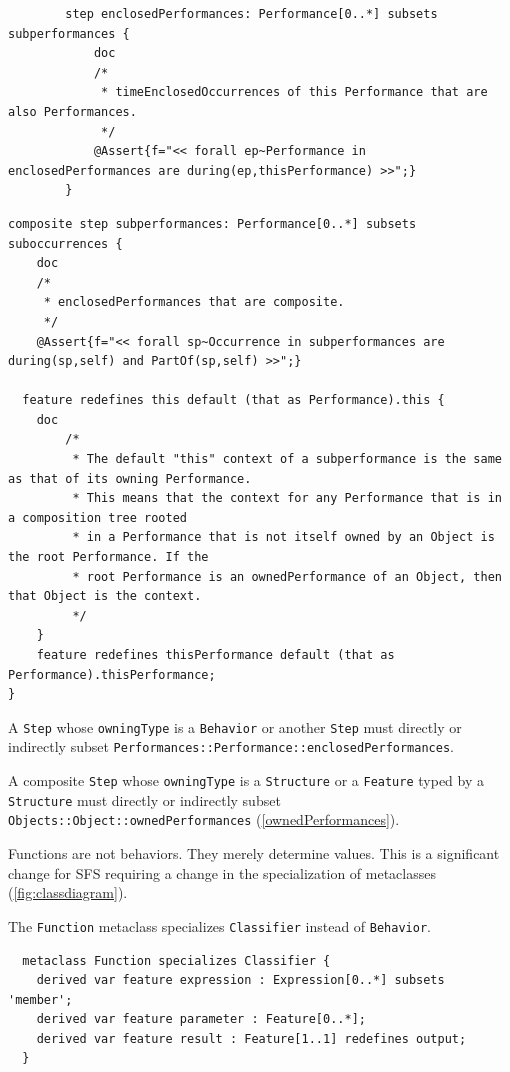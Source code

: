 \begin{lstlisting}
		step enclosedPerformances: Performance[0..*] subsets subperformances {
			doc
			/*
			 * timeEnclosedOccurrences of this Performance that are also Performances.
			 */
			@Assert{f="<< forall ep~Performance in enclosedPerformances are during(ep,thisPerformance) >>";}
		}
\end{lstlisting}

\begin{lstlisting}
composite step subperformances: Performance[0..*] subsets suboccurrences {
	doc
	/*
	 * enclosedPerformances that are composite.
	 */
	@Assert{f="<< forall sp~Occurrence in subperformances are during(sp,self) and PartOf(sp,self) >>";}

  feature redefines this default (that as Performance).this {
    doc
		/*
		 * The default "this" context of a subperformance is the same as that of its owning Performance.
		 * This means that the context for any Performance that is in a composition tree rooted
		 * in a Performance that is not itself owned by an Object is the root Performance. If the
		 * root Performance is an ownedPerformance of an Object, then that Object is the context.
		 */
	}
	feature redefines thisPerformance default (that as Performance).thisPerformance;
}
\end{lstlisting}

\pn A \texttt{Step} whose \texttt{owningType} is a \texttt{Behavior} or another \texttt{Step} must directly or indirectly subset
 \texttt{Performan\-ces::Performance::enclosedPerformances}.

\pn A composite \texttt{Step} whose \texttt{owningType} is a \texttt{Structure} or a \texttt{Feature} typed by a \texttt{Structure} must directly or
indirectly subset \texttt{Objects::Object::ownedPerformances} (\ref{ownedPerformances}).

\label{sec:functions}

\pn Functions are not behaviors.  They merely determine values.
This is a significant change for SFS requiring a change in the specialization of metaclasses (\ref{fig:classdiagram}).

\pn The \texttt{Function} metaclass specializes \texttt{Classifier} instead of \texttt{Behavior}.
\begin{lstlisting}
  metaclass Function specializes Classifier {
  	derived var feature expression : Expression[0..*] subsets 'member';
  	derived var feature parameter : Feature[0..*];
  	derived var feature result : Feature[1..1] redefines output;
  }
\end{lstlisting}

